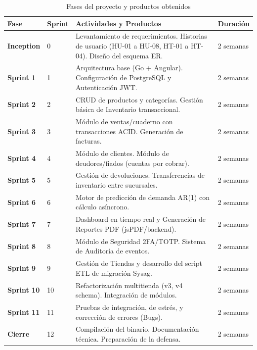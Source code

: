 \documentclass[12pt,a4paper,oneside]{report}
\begin{document}
\begin{table}[H]
\centering
\caption{Fases del proyecto y productos obtenidos}
\begin{tabularx}{\textwidth}{|l|l|X|l|}
\hline
\rowcolor{lightgray}
\textbf{Fase} & \textbf{Sprint} & \textbf{Actividades y Productos} & \textbf{Duración} \\
\hline
\textbf{Inception} & 0 & Levantamiento de requerimientos. Historias de usuario (HU-01 a HU-08, HT-01 a HT-04). Diseño del esquema ER. & 2 semanas \\
\hline
\textbf{Sprint 1} & 1 & Arquitectura base (Go + Angular). Configuración de PostgreSQL y Autenticación JWT. & 2 semanas \\
\hline
\textbf{Sprint 2} & 2 & CRUD de productos y categorías. Gestión básica de Inventario transaccional. & 2 semanas \\
\hline
\textbf{Sprint 3} & 3 & Módulo de ventas/cuaderno con transacciones ACID. Generación de facturas. & 2 semanas \\
\hline
\textbf{Sprint 4} & 4 & Módulo de clientes. Módulo de deudores/fiados (cuentas por cobrar). & 2 semanas \\
\hline
\textbf{Sprint 5} & 5 & Gestión de devoluciones. Transferencias de inventario entre sucursales. & 2 semanas \\
\hline
\textbf{Sprint 6} & 6 & Motor de predicción de demanda AR(1) con cálculo asíncrono. & 2 semanas \\
\hline
\textbf{Sprint 7} & 7 & Dashboard en tiempo real y Generación de Reportes PDF (jsPDF/backend). & 2 semanas \\
\hline
\textbf{Sprint 8} & 8 & Módulo de Seguridad 2FA/TOTP. Sistema de Auditoría de eventos. & 2 semanas \\
\hline
\textbf{Sprint 9} & 9 & Gestión de Tiendas y desarrollo del script ETL de migración Sysag. & 2 semanas \\
\hline
\textbf{Sprint 10} & 10 & Refactorización multitienda (v3, v4 schema). Integración de módulos. & 2 semanas \\
\hline
\textbf{Sprint 11} & 11 & Pruebas de integración, de estrés, y corrección de errores (Bugs). & 2 semanas \\
\hline
\textbf{Cierre} & 12 & Compilación del binario. Documentación técnica. Preparación de la defensa. & 2 semanas \\
\hline
\end{tabularx}
\label{tab:sprints}
\end{table}
\end{document}
